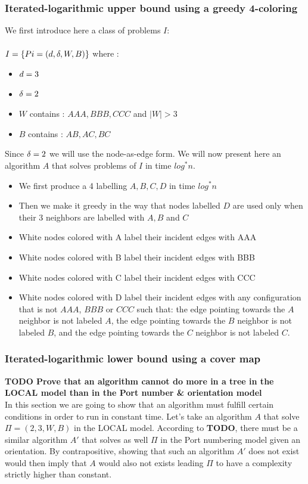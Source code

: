 

\subsubsection{Iterated-logarithmic upper bound using a greedy 4-coloring}
We first introduce here a class of problems $I$:\\\\
$I = \{Pi = (d,\delta,W,B)\}$ where :
\begin{itemize}
    \item $d = 3$
    \item $\delta = 2$
    \item $W$ contains : $AAA,BBB,CCC$ and $|W| > 3$
    \item $B$ contains : $AB,AC,BC$
\end{itemize}
Since $\delta = 2$ we will use the node-as-edge form.
We will now present here an algorithm $A$ that solves problems of $I$ in time $log^*n$.
\begin{itemize}
    \item We first produce a 4 labelling $A,B,C,D$ in time $log^*n$ 
    \item Then we make it greedy in the way that nodes labelled $D$ are used only when their 3 neighbors are labelled with $A,B$ and $C$
    \item White nodes colored with A label their incident edges with AAA
    \item White nodes colored with B label their incident edges with BBB
    \item White nodes colored with C label their incident edges with CCC
    \item White nodes colored with D label their incident edges with any configuration that is not $AAA$, $BBB$ or $CCC$ such that: the edge pointing towards the $A$ neighbor is not labeled $A$, the edge pointing towards the $B$ neighbor is not labeled $B$, and the edge pointing towards the $C$ neighbor is not labeled $C$.\\
\end{itemize}

\subsubsection{Iterated-logarithmic lower bound using a cover map}
\textbf{TODO Prove that an algorithm cannot do more in a tree in the LOCAL model than in the Port number \& orientation model}\\
In this section we are going to show that an algorithm must fulfill certain conditions in order to run in constant time.
Let's take an algorithm $A$ that solve $\Pi = (2,3,W,B)$ in the LOCAL model. According to \textbf{TODO}, there must be a similar algorithm $A'$ that solves as well $\Pi$ in the Port numbering model given an orientation. By contrapositive, showing that such an algorithm $A'$ does not exist would then imply that $A$ would also not exists leading $\Pi$ to have a complexity strictly higher than constant.\\\\

